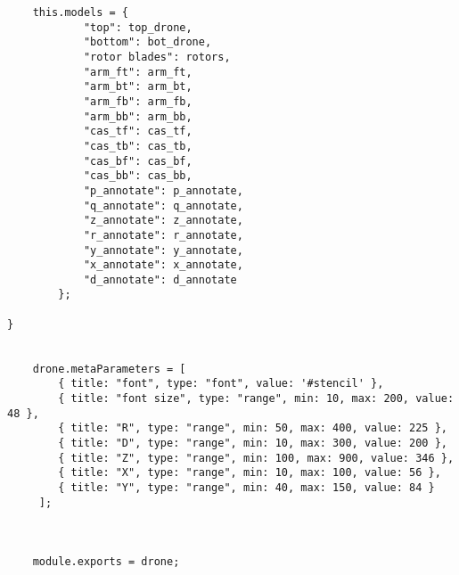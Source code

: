 \documentclass[11pt]{article}
\begin{document}
\begin{lstlisting}
    this.models = {
            "top": top_drone,
            "bottom": bot_drone,
            "rotor blades": rotors,
            "arm_ft": arm_ft,
            "arm_bt": arm_bt,
            "arm_fb": arm_fb,
            "arm_bb": arm_bb,
            "cas_tf": cas_tf,
            "cas_tb": cas_tb,
            "cas_bf": cas_bf,
            "cas_bb": cas_bb,
            "p_annotate": p_annotate,
            "q_annotate": q_annotate,
            "z_annotate": z_annotate,
            "r_annotate": r_annotate,
            "y_annotate": y_annotate,
            "x_annotate": x_annotate,
            "d_annotate": d_annotate
        };

}

                                          
    drone.metaParameters = [
        { title: "font", type: "font", value: '#stencil' },
        { title: "font size", type: "range", min: 10, max: 200, value: 48 },
        { title: "R", type: "range", min: 50, max: 400, value: 225 },
        { title: "D", type: "range", min: 10, max: 300, value: 200 },
        { title: "Z", type: "range", min: 100, max: 900, value: 346 },
        { title: "X", type: "range", min: 10, max: 100, value: 56 },
        { title: "Y", type: "range", min: 40, max: 150, value: 84 }
     ];
                           


    module.exports = drone;

\end{lstlisting}
\end{document}
